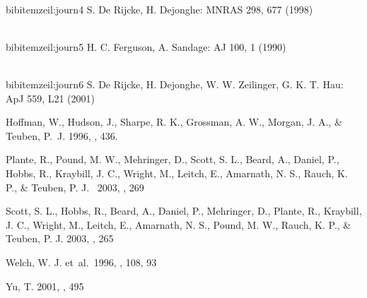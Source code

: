 \\bibitem{zeil:journ4} S. De Rijcke, H. Dejonghe: MNRAS 298, 677 (1998)

\\bibitem{zeil:journ5} H. C. Ferguson, A. Sandage: AJ 100, 1 (1990)

\\bibitem{zeil:journ6} S. De Rijcke, H. Dejonghe, W. W. Zeilinger, G. K. T. Hau: ApJ 559, L21 (2001)



Hoffman, W.,
Hudson, J.,
Sharpe, R. K.,
Grossman, A. W.,
Morgan, J. A., \&
Teuben, P.~J.
1996, \adassv, 436.

 Plante, R.,
 Pound, M. W.,
 Mehringer, D.,
 Scott, S. L.,
 Beard, A.,
 Daniel, P.,
 Hobbs, R.,
 Kraybill, J. C.,
 Wright, M.,
 Leitch, E.,
 Amarnath, N. S.,
 Rauch, K. P., \&
 Teuben, P. J.
\  2003, \adassxii, 269

 Scott, S. L.,
 Hobbs, R.,
 Beard, A.,
 Daniel, P.,
 Mehringer, D.,
 Plante, R.,
 Kraybill, J. C.,
 Wright, M.,
 Leitch, E.,
 Amarnath, N. S.,
 Pound, M. W.,
 Rauch, K. P., \&
 Teuben, P. J.
  2003, \adassxii, 265

Welch, W. J. et~al.\ 1996, \pasp, 108, 93

Yu, T. 2001, \adassx, 495


